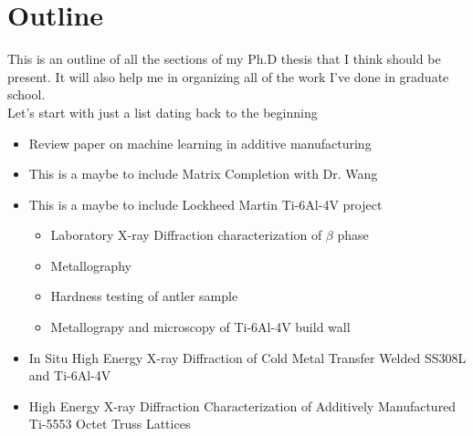 \chapter{Outline}
This is an outline of all the sections of my Ph.D thesis that I think should be present. It will also help me in organizing all of the work I've done in graduate school.
\\
Let's start with just a list dating back to the beginning
\begin{itemize}
	\item Review paper on machine learning in additive manufacturing
	\item {\color{red} This is a maybe to include} Matrix Completion with Dr. Wang
	\item {\color{red} This is a maybe to include} Lockheed Martin Ti-6Al-4V project 
		\begin{itemize}
		\item Laboratory X-ray Diffraction characterization of $\beta$ phase
		\item Metallography
		\item Hardness testing of antler sample 
		\item Metallograpy and microscopy of Ti-6Al-4V build wall
		\end{itemize}
	\item In Situ High Energy X-ray Diffraction of Cold Metal Transfer Welded SS308L and Ti-6Al-4V 
	\item High Energy X-ray Diffraction Characterization of Additively Manufactured Ti-5553 Octet Truss Lattices 
\end{itemize}
